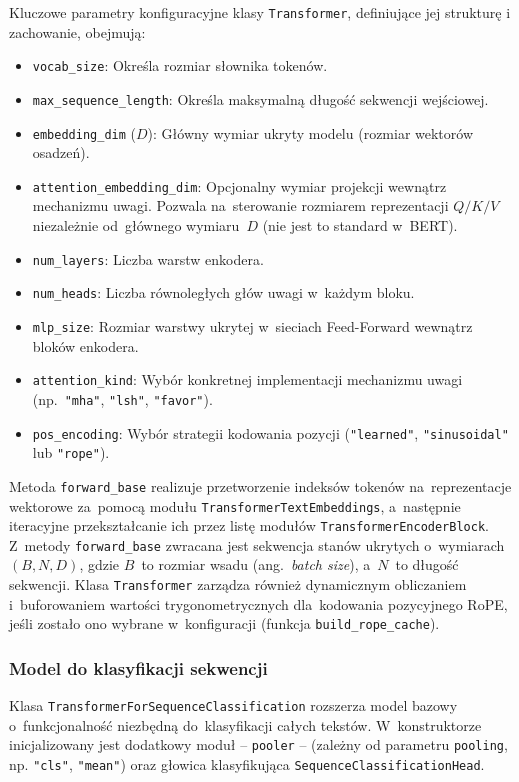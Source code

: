 \documentclass[a4paper,11pt,twoside]{report}
\theoremstyle{definition}
\begin{document}
Kluczowe parametry konfiguracyjne klasy \texttt{Transformer}, definiujące jej strukturę i zachowanie, obejmują:
\begin{itemize}
    \item \texttt{vocab\_size}: Określa rozmiar słownika tokenów.
    \item \texttt{max\_sequence\_length}: Określa maksymalną długość sekwencji wejściowej.
    \item \texttt{embedding\_dim} ($D$): Główny wymiar ukryty modelu (rozmiar wektorów osadzeń).
    \item \texttt{attention\_embedding\_dim}: Opcjonalny wymiar projekcji wewnątrz mechanizmu uwagi. Pozwala na~sterowanie rozmiarem reprezentacji $Q/K/V$ niezależnie od~głównego wymiaru~$D$ (nie jest to standard w~BERT).
    \item \texttt{num\_layers}: Liczba warstw enkodera.
    \item \texttt{num\_heads}: Liczba równoległych głów uwagi w~każdym bloku.
    \item \texttt{mlp\_size}: Rozmiar warstwy ukrytej w~sieciach Feed-Forward wewnątrz bloków enkodera.
    \item \texttt{attention\_kind}: Wybór konkretnej implementacji mechanizmu uwagi (np.\ \texttt{"mha"}, \texttt{"lsh"}, \texttt{"favor"}).
    \item \texttt{pos\_encoding}: Wybór strategii kodowania pozycji (\texttt{"learned"}, \texttt{"sinusoidal"} lub \texttt{"rope"}).
\end{itemize}

Metoda \texttt{forward\_base} realizuje przetworzenie indeksów tokenów na~reprezentacje wektorowe za~pomocą modułu \texttt{TransformerTextEmbeddings}, a~następnie iteracyjne przekształcanie ich przez listę modułów \texttt{TransformerEncoderBlock}. Z~metody \texttt{forward\_base} zwracana jest sekwencja stanów ukrytych o~wymiarach $(B, N, D)$, gdzie $B$~to rozmiar wsadu (ang.\ \emph{batch size}), a~$N$~to długość sekwencji. Klasa \texttt{Transformer} zarządza również dynamicznym obliczaniem i~buforowaniem wartości trygonometrycznych dla~kodowania pozycyjnego RoPE, jeśli zostało ono wybrane w~konfiguracji (funkcja \texttt{build\_rope\_cache}).

\subsubsection{Model do klasyfikacji sekwencji}
Klasa \texttt{TransformerForSequenceClassification} rozszerza model bazowy o~funkcjonalność niezbędną do~klasyfikacji całych tekstów. W~konstruktorze inicjalizowany jest dodatkowy moduł -- \texttt{pooler} -- (zależny od parametru \texttt{pooling}, np. \texttt{"cls"}, \texttt{"mean"}) oraz głowica klasyfikująca \texttt{SequenceClassificationHead}.
\end{document}
